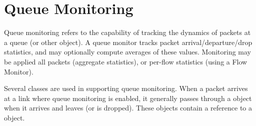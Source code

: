 \section{Queue Monitoring}
\label{sec:qmonitor}

Queue monitoring refers to the capability of tracking the
dynamics of packets at a queue (or other object).
A queue monitor tracks packet arrival/departure/drop statistics,
and may optionally compute averages of these values.
Monitoring may be applied all packets (aggregate statistics), or
per-flow statistics (using a Flow Monitor).

Several classes are used in supporting queue monitoring.
When a packet arrives at a link where queue monitoring is enabled,
it generally passes through a  object when it
arrives and leaves (or is dropped).
These objects contain a reference to a  object.

